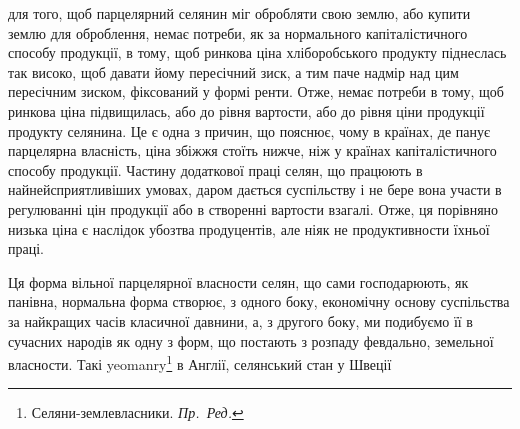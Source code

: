 для того, щоб парцелярний селянин міг обробляти свою землю, або купити
землю для оброблення, немає потреби, як за нормального капіталістичного
способу продукції, в тому, щоб ринкова ціна хліборобського продукту піднеслась
так високо, щоб давати йому пересічний зиск, а тим паче надмір над цим
пересічним зиском, фіксований у формі ренти. Отже, немає потреби в тому,
щоб ринкова ціна підвищилась, або до рівня вартости, або до рівня ціни продукції
продукту селянина. Це є одна з причин, що пояснює, чому в країнах,
де панує парцелярна власність, ціна збіжжя стоїть нижче, ніж у країнах капіталістичного
способу продукції. Частину додаткової праці селян, що працюють
в найнейсприятливіших умовах, даром дається суспільству і не бере вона участи
в регулюванні цін продукції або в створенні вартости взагалі. Отже, ця порівняно
низька ціна є наслідок убозтва продуцентів, але ніяк не продуктивности
їхньої праці.

Ця форма вільної парцелярної власности селян, що сами господарюють, як
панівна, нормальна форма створює, з одного боку, економічну основу суспільства
за найкращих часів класичної давнини, а, з другого боку, ми подибуємо
її в сучасних народів як одну з форм, що постають з розпаду февдально,
земельної власности. Такі yeomanry\footnote*{
Селяни-землевласники. \emph{Пр.~Ред.}
} в Англії, селянський стан у Швеції
\parbreak{}  %
